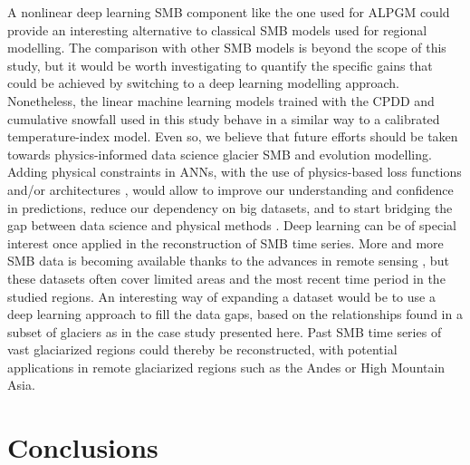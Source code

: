 A nonlinear deep learning SMB component like the one used for ALPGM could provide an interesting alternative to classical SMB models used for regional modelling. The comparison with other SMB models is beyond the scope of this study, but it would be worth investigating to quantify the specific gains that could be achieved by switching to a deep learning modelling approach. Nonetheless, the linear machine learning models trained with the CPDD and cumulative snowfall used in this study behave in a similar way to a calibrated temperature-index model. Even so, we believe that future efforts should be taken towards physics-informed data science glacier SMB and evolution modelling. Adding physical constraints in ANNs, with the use of physics-based loss functions and/or architectures \cite[e.g.,][]{karpatne_physics-guided_2018}, would allow to improve our understanding and confidence in predictions, reduce our dependency on big datasets, and to start bridging the gap between data science and physical methods \citep{karpatne_theory-guided_2017, de_bezenac_deep_2018, lguensat_learning_2019, rackauckas_universal_2020}.  Deep learning can be of special interest once applied in the reconstruction of SMB time series. More and more SMB data is becoming available thanks to the advances in remote sensing \citep[e.g.,][]{brun_spatially_2017, zemp_global_2019, dussaillant_two_2019}, but these datasets often cover limited areas and the most recent time period in the studied regions. An interesting way of expanding a dataset would be to use a deep learning approach to fill the data gaps, based on the relationships found in a subset of glaciers as in the case study presented here. Past SMB time series of vast glaciarized regions could thereby be reconstructed, with potential applications in remote glaciarized regions such as the Andes or High Mountain Asia. 

\section{Conclusions} 


